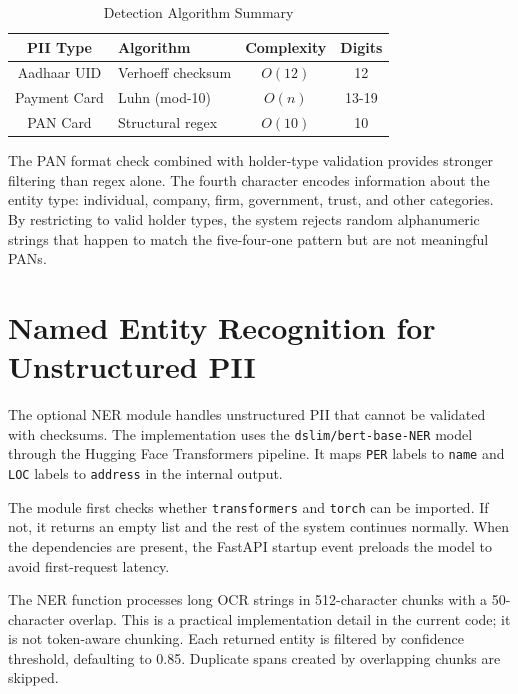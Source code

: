 \begin{table}[htbp]
\caption{Detection Algorithm Summary}
\label{tab:detection_algorithms}
\centering
\begin{tabular}{|c|l|c|c|}
\hline
\textbf{PII Type} & \textbf{Algorithm} & \textbf{Complexity} & \textbf{Digits} \\
\hline
Aadhaar UID    & Verhoeff checksum  & $O(12)$   & 12 \\
\hline
Payment Card   & Luhn (mod-10)      & $O(n)$    & 13-19 \\
\hline
PAN Card       & Structural regex   & $O(10)$   & 10 \\
\hline
\end{tabular}
\end{table}

\bigskip

The PAN format check combined with holder-type validation provides stronger filtering than regex alone. The fourth character encodes information about the entity type: individual, company, firm, government, trust, and other categories. By restricting to valid holder types, the system rejects random alphanumeric strings that happen to match the five-four-one pattern but are not meaningful PANs.

\bigskip

\section{Named Entity Recognition for Unstructured PII}

The optional NER module handles unstructured PII that cannot be validated with checksums. The implementation uses the \texttt{dslim/bert-base-NER} model through the Hugging Face Transformers pipeline. It maps \texttt{PER} labels to \texttt{name} and \texttt{LOC} labels to \texttt{address} in the internal output.

The module first checks whether \texttt{transformers} and \texttt{torch} can be imported. If not, it returns an empty list and the rest of the system continues normally. When the dependencies are present, the FastAPI startup event preloads the model to avoid first-request latency.

The NER function processes long OCR strings in 512-character chunks with a 50-character overlap. This is a practical implementation detail in the current code; it is not token-aware chunking. Each returned entity is filtered by confidence threshold, defaulting to 0.85. Duplicate spans created by overlapping chunks are skipped.

